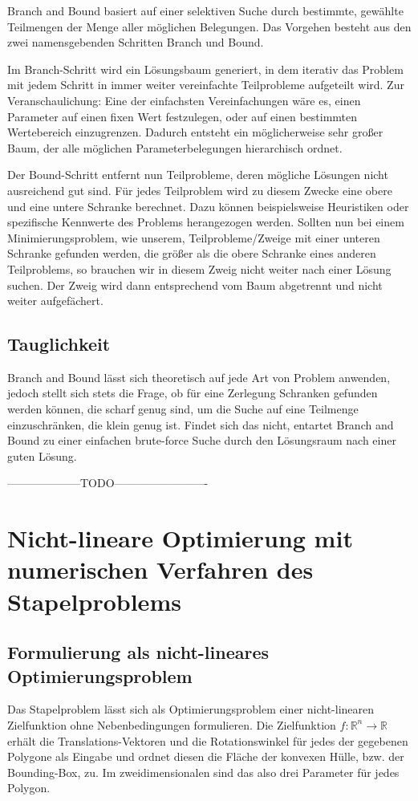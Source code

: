 \documentclass[runningheads,a4paper]{llncs}
\begin{document}
Branch and Bound basiert auf einer selektiven Suche durch bestimmte, gewählte Teilmengen der Menge aller möglichen Belegungen. Das Vorgehen besteht aus den zwei namensgebenden Schritten Branch und Bound.

Im Branch-Schritt wird ein Lösungsbaum generiert, in dem iterativ das Problem mit jedem Schritt in immer weiter vereinfachte Teilprobleme aufgeteilt wird. Zur Veranschaulichung: Eine der einfachsten Vereinfachungen wäre es, einen Parameter auf einen fixen Wert festzulegen, oder auf einen bestimmten Wertebereich einzugrenzen. 
Dadurch entsteht ein möglicherweise sehr großer Baum, der alle möglichen Parameterbelegungen hierarchisch ordnet.

Der Bound-Schritt entfernt nun Teilprobleme, deren mögliche Lösungen nicht ausreichend gut sind. Für jedes Teilproblem wird zu diesem Zwecke eine obere und eine untere Schranke berechnet. Dazu können beispielsweise Heuristiken oder spezifische Kennwerte des Problems herangezogen werden.
Sollten nun bei einem Minimierungsproblem, wie unserem, Teilprobleme/Zweige mit einer unteren Schranke gefunden werden, die größer als die obere Schranke eines anderen Teilproblems, so brauchen wir in diesem Zweig nicht weiter nach einer Lösung suchen. Der Zweig wird dann entsprechend vom Baum abgetrennt und nicht weiter aufgefächert.

\subsection{Tauglichkeit}

Branch and Bound lässt sich theoretisch auf jede Art von Problem anwenden, jedoch stellt sich stets die Frage, ob für eine Zerlegung Schranken gefunden werden können, die scharf genug sind, um die Suche auf eine Teilmenge einzuschränken, die klein genug ist. 
Findet sich das nicht, entartet Branch and Bound zu einer einfachen brute-force Suche durch den Lösungsraum nach einer guten Lösung.

--------------------TODO-------------------------

\section{Nicht-lineare Optimierung mit numerischen Verfahren des Stapelproblems}

\subsection{Formulierung als nicht-lineares Optimierungsproblem}
\label{formObjStacking}
Das Stapelproblem lässt sich als Optimierungsproblem einer nicht-linearen Zielfunktion ohne Nebenbedingungen formulieren. Die Zielfunktion ${f: \mathbb{R}^n \rightarrow \mathbb{R}}$ erhält die Translations-Vektoren und die Rotationswinkel für jedes der gegebenen Polygone als Eingabe und ordnet diesen die Fläche der konvexen Hülle, bzw. der Bounding-Box, zu. Im zweidimensionalen sind das also drei Parameter für jedes Polygon.
\end{document}
